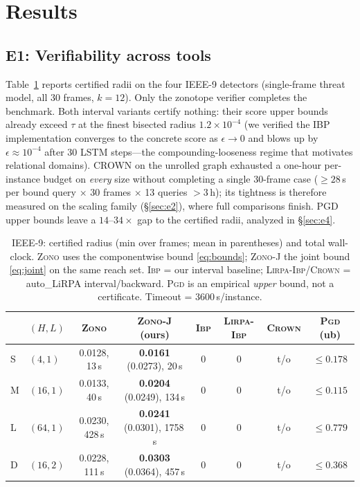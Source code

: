 \documentclass{article} %
\begin{document}
\section{Results}
\label{sec:results}

\subsection{E1: Verifiability across tools}

Table~\ref{tab:e1} reports certified radii on the four IEEE-9
detectors (single-frame threat model, all 30 frames, $k{=}12$). Only
the zonotope verifier completes the benchmark. Both interval variants
certify nothing: their score upper bounds already exceed $\tau$ at the
finest bisected radius $1.2\times10^{-4}$ (we verified the IBP
implementation converges to the concrete score as
$\epsilon \to 0$ and blows up by $\epsilon \approx 10^{-4}$ after 30
LSTM steps---the compounding-looseness regime that motivates relational
domains). CROWN on the unrolled graph exhausted a one-hour
per-instance budget on \emph{every} size without completing a single
30-frame case ($\ge 28$\,s per bound query $\times$ 30 frames
$\times$ 13 queries $> 3$\,h); its tightness is therefore measured on
the scaling family (\S\ref{sec:e2}), where full comparisons finish.
PGD upper bounds leave a $14$--$34\times$ gap to the certified radii,
analyzed in \S\ref{sec:e4}.

\begin{table}[h]
\caption{IEEE-9: certified radius (min over frames; mean in
parentheses) and total wall-clock. \textsc{Zono} uses the
componentwise bound \eqref{eq:bounds}; \textsc{Zono-J} the joint bound
\eqref{eq:joint} on the same reach set. \textsc{Ibp} = our interval
baseline; \textsc{Lirpa-Ibp/Crown} = auto\_LiRPA interval/backward.
\textsc{Pgd} is an empirical \emph{upper} bound, not a certificate.
Timeout = 3600\,s/instance.}
\label{tab:e1}
\begin{center}
\scriptsize
\setlength{\tabcolsep}{3.5pt}
\begin{tabular}{llcccccc}
\toprule
 & $(H, L)$ & \textsc{Zono} & \textsc{Zono-J} (ours) & \textsc{Ibp} & \textsc{Lirpa-Ibp} & \textsc{Crown} & \textsc{Pgd} (ub) \\
\midrule
S & $(4,1)$  & 0.0128, 13\,s & \textbf{0.0161} (0.0273), 20\,s & 0 & 0 & t/o & $\le 0.178$ \\
M & $(16,1)$ & 0.0133, 40\,s & \textbf{0.0204} (0.0249), 134\,s & 0 & 0 & t/o & $\le 0.115$ \\
L & $(64,1)$ & 0.0230, 428\,s & \textbf{0.0241} (0.0301), 1758\,s & 0 & 0 & t/o & $\le 0.779$ \\
D & $(16,2)$ & 0.0228, 111\,s & \textbf{0.0303} (0.0364), 457\,s & 0 & 0 & t/o & $\le 0.368$ \\
\bottomrule
\end{tabular}
\end{center}
\end{table}
\end{document}
